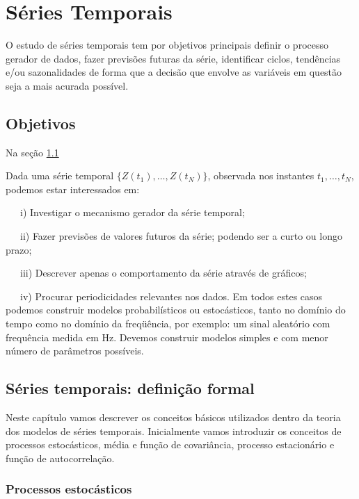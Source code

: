\documentclass[
]{book}
\theoremstyle{definition}
\theoremstyle{definition}
\theoremstyle{definition}
\theoremstyle{remark}
\begin{document}
\hypertarget{st}{%
\chapter{Séries Temporais}\label{st}}

O estudo de séries temporais tem por objetivos principais definir o processo gerador de dados, fazer previsões futuras da série, identificar ciclos, tendências e/ou sazonalidades de forma que a decisão que envolve as variáveis em questão seja a mais acurada possível.

\hypertarget{objetivos}{%
\section{Objetivos}\label{objetivos}}

Na seção \ref{objetivos}

Dada uma série temporal \(\{Z(t_1 ),\ldots, Z(t_N)\}\), observada nos instantes \(t_1,\ldots,t_N\),
podemos estar interessados em:

~~~i) Investigar o mecanismo gerador da série temporal;

~~~ii) Fazer previsões de valores futuros da série; podendo ser a curto ou longo prazo;

~~~iii) Descrever apenas o comportamento da série através de gráficos;

~~~iv) Procurar periodicidades relevantes nos dados. Em todos estes casos podemos construir modelos probabilísticos ou estocásticos, tanto no domínio do tempo como no domínio da freqüência, por exemplo: um sinal aleatório com frequência medida em Hz. Devemos construir modelos simples e com menor número de parâmetros possíveis.

\hypertarget{suxe9ries-temporais-definiuxe7uxe3o-formal}{%
\section{Séries temporais: definição formal}\label{suxe9ries-temporais-definiuxe7uxe3o-formal}}

Neste capítulo vamos descrever os conceitos básicos utilizados dentro da teoria dos modelos de séries temporais. Inicialmente vamos introduzir os conceitos de processos estocásticos, média e função de covariância, processo estacionário e função de autocorrelação.

\hypertarget{processos-estocuxe1sticos}{%
\subsection{Processos estocásticos}\label{processos-estocuxe1sticos}}
\end{document}

